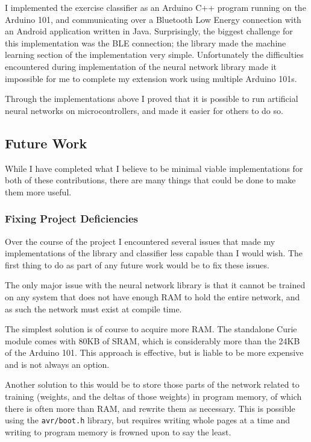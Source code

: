 \documentclass[a4paper]{article}
\begin{document}
I implemented the exercise classifier as an Arduino C++ program running on the Arduino 101, and communicating over a Bluetooth Low Energy connection with an Android application written in Java. 
Surprisingly, the biggest challenge for this implementation was the BLE connection; the library made the machine learning section of the implementation very simple.
Unfortunately the difficulties encountered during implementation of the neural network library made it impossible for me to complete my extension work using multiple Arduino 101s.

Through the implementations above I proved that it is possible to run artificial neural networks on microcontrollers, and made it easier for others to do so.

\subsection{Future Work}%

While I have completed what I believe to be minimal viable implementations for both of these contributions, there are many things that could be done to make them more useful.

\subsubsection{Fixing Project Deficiencies}

Over the course of the project I encountered several issues that made my implementations of the library and classifier less capable than I would wish. The first thing to do as part of any future work would be to fix these issues.

The only major issue with the neural network library is that it cannot be trained on any system that does not have enough RAM to hold the entire network, and as such the network must exist at compile time.

The simplest solution is of course to acquire more RAM. The standalone Curie module comes with 80KB of SRAM\cite{fwref2}, which is considerably more than the 24KB of the Arduino 101. This approach is effective, but is liable to be more expensive and is not always an option.

Another solution to this would be to store those parts of the network related to training (weights, and the deltas of those weights) in program memory, of which there is often more than RAM, and rewrite them as necessary. This is possible using the \lstinline{avr/boot.h} library, but requires writing whole pages at a time and writing to program memory is frowned upon to say the least.\cite{fwref0}
\end{document}
